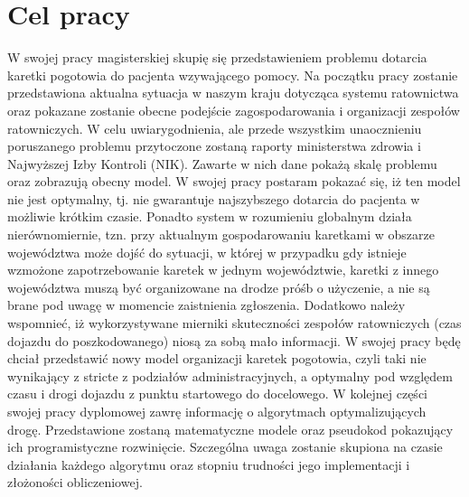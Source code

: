 \documentclass[12pt]{article} %
\begin{document}
\section{Cel pracy}
W swojej pracy magisterskiej skupię się przedstawieniem problemu dotarcia karetki pogotowia do pacjenta wzywającego pomocy.
Na początku pracy zostanie przedstawiona aktualna sytuacja w naszym kraju dotycząca systemu ratownictwa oraz pokazane zostanie obecne podejście zagospodarowania i organizacji zespołów ratowniczych. W celu uwiarygodnienia, ale przede wszystkim unaocznieniu poruszanego problemu przytoczone zostaną raporty ministerstwa zdrowia i Najwyższej Izby Kontroli (NIK). Zawarte w nich dane pokażą skalę problemu oraz zobrazują obecny model. W swojej pracy postaram pokazać się, iż ten model nie jest optymalny, tj. nie
gwarantuje najszybszego dotarcia do pacjenta w możliwie krótkim czasie. Ponadto system w rozumieniu globalnym działa nierównomiernie, tzn. przy aktualnym gospodarowaniu karetkami w obszarze województwa może dojść do sytuacji, w której w przypadku gdy istnieje wzmożone zapotrzebowanie karetek w jednym województwie, karetki z innego województwa muszą być organizowane na drodze próśb o użyczenie, a nie są brane pod uwagę w momencie zaistnienia zgłoszenia. Dodatkowo należy wspomnieć, iż wykorzystywane mierniki skuteczności zespołów ratowniczych (czas dojazdu do poszkodowanego) niosą za sobą mało informacji.
W swojej pracy będę chciał przedstawić nowy model organizacji karetek pogotowia, czyli taki nie wynikający z stricte z podziałów administracyjnych, a optymalny pod względem czasu i drogi dojazdu z punktu startowego do docelowego.
W kolejnej części swojej pracy dyplomowej zawrę informację o algorytmach optymalizujących drogę. Przedstawione zostaną matematyczne modele oraz pseudokod pokazujący ich programistyczne rozwinięcie. Szczególna uwaga zostanie skupiona na czasie działania każdego algorytmu oraz stopniu trudności jego implementacji i złożoności obliczeniowej.
\end{document}
